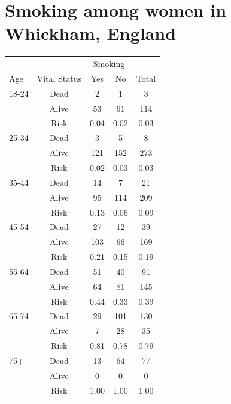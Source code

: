 \documentclass[landscape,twocolumn,letterpaper,9pt,reqno]{article}\usepackage[]{graphicx}\usepackage[]{color}
\begin{document}
\clearpage

\section{Smoking among women in Whickham, England}


\begin{table}[h]
	\centering
	\begin{tabular}{lcccc}
		 &  &   \multicolumn{2}{c}{Smoking} &  \\		
		Age & Vital Status &  Yes & No & Total \\
		18-24 	& Dead 	& 2  	& 1 	& 3 	\\	
		 		& Alive & 53  	& 61 	& 114 	\\
		 		& Risk & 0.04  	& 0.02 	& 0.03 	\\
		 		\hline
		25-34 	& Dead 	& 3  	& 5 	& 8 	\\	
& Alive & 121  	& 152 	& 273 	\\
& Risk & 0.02  	& 0.03 	& 0.03 \\
\hline 			
35-44 	& Dead 	& 14  	& 7 	& 21 	\\	
& Alive & 95  	& 114 	& 209 	\\
& Risk & 0.13  	& 0.06 	& 0.09 \\
\hline
45-54 	& Dead 	& 27  	& 12 	& 39 	\\	
& Alive & 103  	& 66 	& 169 	\\
& Risk & 0.21  	& 0.15 	& 0.19 \\
		 		\hline
55-64 	& Dead 	& 51  	& 40 	& 91 	\\	
& Alive & 64  	& 81 	& 145 	\\
& Risk & 0.44  	& 0.33 	& 0.39 \\
		 		\hline
65-74 	& Dead 	& 29  	& 101 	& 130 	\\	
& Alive & 7  	& 28 	& 35 	\\
& Risk & 0.81  	& 0.78 	& 0.79 \\
		 		\hline
75+ 	& Dead 	& 13  	& 64 	& 77 	\\	
& Alive & 0  	& 0 	& 0 	\\
& Risk & 1.00  	& 1.00 	& 1.00 \\
\hline
	\end{tabular}
\end{table}
\end{document}
